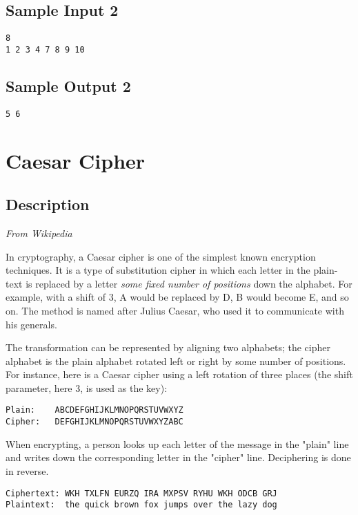 \documentclass[12pt]{article}
\begin{document}
\subsection*{Sample Input 2}
\begin{verbatim}
8
1 2 3 4 7 8 9 10
\end{verbatim}
\subsection*{Sample Output 2}
\begin{verbatim}
5 6
\end{verbatim}



\newpage

\section{Caesar Cipher}
\subsection*{Description}
\textit{From Wikipedia} 

In cryptography, a Caesar cipher is one of the simplest known encryption techniques.  It is a type of substitution cipher in which each letter in the plain-text is replaced by a letter \textit{some fixed number of positions} down the alphabet. For example, with a shift of $3$, A would be replaced by D, B would become E, and so on. The method is named after Julius Caesar, who used it to communicate with his generals.


The transformation can be represented by aligning two alphabets; the cipher alphabet is the plain alphabet rotated left or right by some number of positions. For instance, here is a Caesar cipher using a left rotation of three places (the shift parameter, here 3, is used as the key):
\begin{verbatim}
Plain:    ABCDEFGHIJKLMNOPQRSTUVWXYZ
Cipher:   DEFGHIJKLMNOPQRSTUVWXYZABC
\end{verbatim}

When encrypting, a person looks up each letter of the message in the "plain" line and writes down the corresponding letter in the "cipher" line. Deciphering is done in reverse.
\begin{verbatim}
Ciphertext: WKH TXLFN EURZQ IRA MXPSV RYHU WKH ODCB GRJ
Plaintext:  the quick brown fox jumps over the lazy dog
\end{verbatim}
\end{document}
